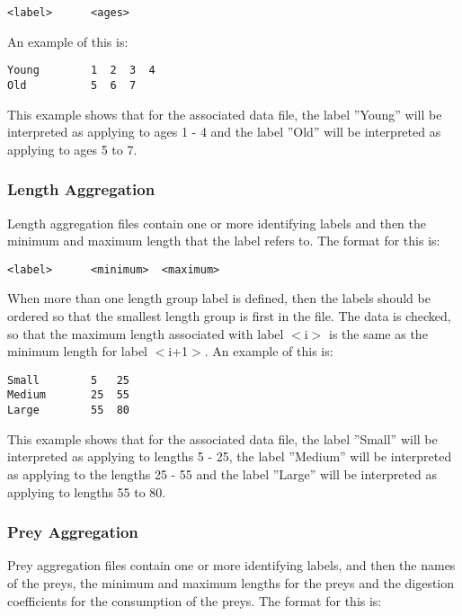 \documentclass [a4paper, 10pt]{book}
\begin{document}
{\small\begin{verbatim}
<label>      <ages>
\end{verbatim}}

An example of this is:

{\small\begin{verbatim}
Young        1  2  3  4
Old          5  6  7
\end{verbatim}}

This example shows that for the associated data file, the label ''Young'' will be interpreted as applying to ages 1 - 4 and the label ''Old'' will be interpreted as applying to ages 5 to 7.

\subsubsection{Length Aggregation}
Length aggregation files contain one or more identifying labels and then the minimum and maximum length that the label refers to.  The format for this is:

{\small\begin{verbatim}
<label>      <minimum>  <maximum>
\end{verbatim}}

When more than one length group label is defined, then the labels should be ordered so that the smallest length group is first in the file.  The data is checked, so that the maximum length associated with label $<$i$>$ is the same as the minimum length for label $<$i+1$>$.  An example of this is:

{\small\begin{verbatim}
Small        5   25
Medium       25  55
Large        55  80
\end{verbatim}}

This example shows that for the associated data file, the label ''Small'' will be interpreted as applying to lengths 5 - 25, the label ''Medium'' will be interpreted as applying to the lengths 25 - 55 and the label ''Large'' will be interpreted as applying to lengths 55 to 80.

\subsubsection{Prey Aggregation}
Prey aggregation files contain one or more identifying labels, and then the names of the preys, the minimum and maximum lengths for the preys and the digestion coefficients for the consumption of the preys.  The format for this is:
\end{document}
